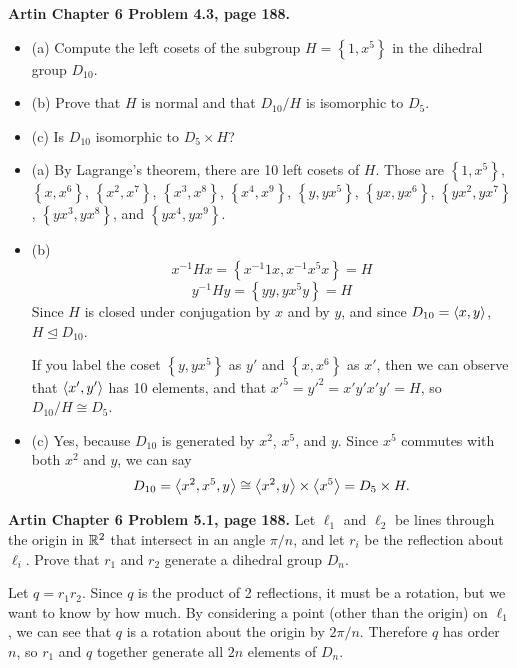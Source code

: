 \documentclass{article}
\begin{document}
\bigskip
\begin{prob}
    \textbf{Artin Chapter 6 Problem 4.3, page 188.}
    \begin{itemize}
        \item (a) Compute the left cosets of the subgroup $H = \left\{ 1, x^5 \right\}$ in the dihedral group $D_{10}$.
        \item (b) Prove that $H$ is normal and that $D_{10}/H$ is isomorphic to $D_5$.
        \item (c) Is $D_{10}$ isomorphic to $D_5 \times H$?
    \end{itemize}
\end{prob}
\begin{itemize}
    \item (a) By Lagrange's theorem, there are 10 left cosets of $H$. Those are $\left\{1,x^5\right\}$, $\left\{x,x^6\right\}$, $\left\{x^2,x^7\right\}$, $\left\{x^3,x^8\right\}$, $\left\{x^4,x^9\right\}$, $\left\{y,yx^5\right\}$, $\left\{yx,yx^6\right\}$, $\left\{yx^2,yx^7\right\}$, $\left\{yx^3,yx^8\right\}$, and $\left\{yx^4,yx^9\right\}$.
    \item (b)
        \[ x^{-1}Hx = \left\{ x^{-1}1x, x^{-1}x^5x \right\} = H \]
        \[ y^{-1}Hy = \left\{ yy, yx^5y \right\} = H \]
        Since $H$ is closed under conjugation by $x$ and by $y$, and since $D_{10} = \left\langle x, y \right\rangle$, $H \trianglelefteq D_{10}$.
        \par
        If you label the coset $ \left\{ y, yx^5 \right\}$ as $y'$ and $ \left\{ x, x^6 \right\}$ as $x'$, then we can observe that $ \left\langle x', y' \right\rangle$ has 10 elements, and that $x'^5=y'^2=x'y'x'y'=H$, so $D_{10}/H\cong D_5$. 
    \item (c) Yes, because $D_{10}$ is generated by $x^2$, $x^5$, and $y$. Since $x^5$ commutes with both $x^2$ and $y$, we can say
        \[ D_{10} = \left\langle x^2, x^5, y \right\rangle \cong \left\langle x^2, y \right\rangle \times \left\langle x^5 \right\rangle = D_{5} \times H. \]
        
\end{itemize}

\bigskip
\begin{prob}
    \textbf{Artin Chapter 6 Problem 5.1, page 188.} Let $\ell_1$ and $\ell_2$ be lines through the origin in $\mathbb{R}^2$ that intersect in an angle $\pi/n$, and let $r_i$ be the reflection about $\ell_i$. Prove that $r_1$ and $r_2$ generate a dihedral group $D_n$.
\end{prob}
Let $q=r_1r_2$. Since $q$ is the product of 2 reflections, it must be a rotation, but we want to know by how much. By considering a point (other than the origin) on $\ell_1$, we can see that $q$ is a rotation about the origin by $2\pi/n$. Therefore $q$ has order $n$, so $r_1$ and $q$ together generate all $2n$ elements of $D_n$.
\end{document}

